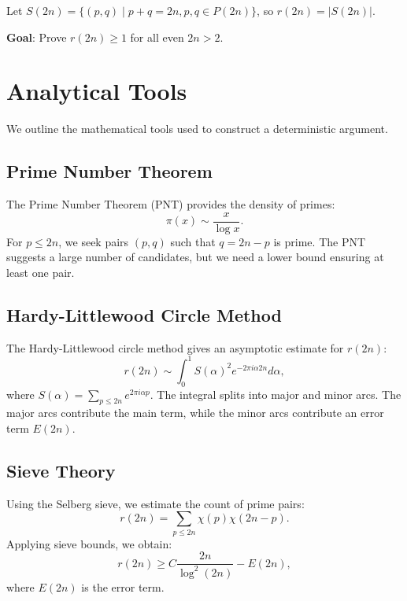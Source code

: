 \documentclass[11pt]{article}
\theoremstyle{plain}
\begin{document}
\begin{definition}
Let $S(2n) = \{(p,q) \mid p+q=2n, p,q \in P(2n)\}$, so $r(2n) = |S(2n)|$.
\end{definition}

\textbf{Goal}: Prove $r(2n) \geq 1$ for all even $2n > 2$.

\section{Analytical Tools}
We outline the mathematical tools used to construct a deterministic argument.

\subsection{Prime Number Theorem}
The Prime Number Theorem (PNT) provides the density of primes:
\begin{equation}
    \pi(x) \sim \frac{x}{\log x}.
\end{equation}
For $p \leq 2n$, we seek pairs $(p,q)$ such that $q=2n-p$ is prime. The PNT suggests a large number of candidates, but we need a lower bound ensuring at least one pair.

\subsection{Hardy-Littlewood Circle Method}
The Hardy-Littlewood circle method gives an asymptotic estimate for $r(2n)$:
\begin{equation}
    r(2n) \sim \int_0^1 S(\alpha)^2 e^{-2\pi i \alpha 2n} d\alpha,
\end{equation}
where $S(\alpha) = \sum_{p \leq 2n} e^{2\pi i \alpha p}$. The integral splits into major and minor arcs. The major arcs contribute the main term, while the minor arcs contribute an error term $E(2n)$.

\subsection{Sieve Theory}
Using the Selberg sieve, we estimate the count of prime pairs:
\begin{equation}
    r(2n) = \sum_{p \leq 2n} \chi(p) \chi(2n - p).
\end{equation}
Applying sieve bounds, we obtain:
\begin{equation}
    r(2n) \geq C \frac{2n}{\log^2(2n)} - E(2n),
\end{equation}
where $E(2n)$ is the error term.
\end{document}
